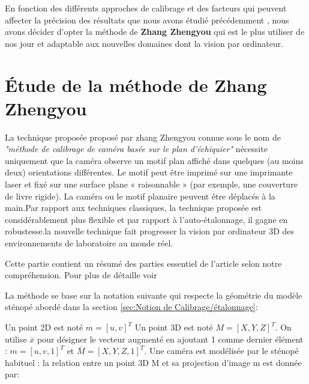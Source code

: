 \begin{itemize}[label={\Huge$\star$}]
\end{itemize}

 
 En fonction des différents approches de calibrage et des facteurs qui peuvent affecter la précision des résultats que nous avons étudié précédemment , nous avons décider d'opter la méthode de \textbf{Zhang Zhengyou}\cite{zhengyou_zhang_flexible_1999} qui est le plus utiliser de nos jour et adaptable aux nouvelles domaines dont la vision par ordinateur.
 
 \section{Étude de la méthode de Zhang Zhengyou}
 
  
 La technique proposée proposé par zhang Zhengyou  \cite{zhengyou_zhang_flexible_1999} connue sous le nom de \textit{"méthode de calibrage de caméra basée sur le plan d'échiquier"} nécessite uniquement que la caméra observe un motif plan affiché dans quelques (au moins deux) orientations  différentes. Le motif peut être imprimé sur une imprimante laser et fixé  sur une surface plane « raisonnable » (par exemple, une couverture de livre rigide). La caméra ou le motif planaire peuvent être déplacés à la main.Par rapport aux techniques classiques, la technique proposée est considérablement plus flexible et par rapport à  l’auto-étalonnage, il gagne en robustesse.la nouvelle technique fait progresser la vision par ordinateur 3D des environnements de laboratoire au monde réel.
 
 Cette partie contient un résumé des parties essentiel de l'article selon notre compréhension. Pour plus de détaille voir
 \cite{zhengyou_zhang_flexible_1999}  
 
 La méthode se base sur la notation suivante qui respecte la géométrie du modèle sténopé abordé dans la section \ref{sec:Notion de  Calibrage/étalonnage}:
 
 Un point 2D est noté $m = [u, v]^{T}$ Un point 3D est noté $M = [X, Y, Z]^{T}$. On utilise $\bar{x}$ pour désigner le vecteur augmenté en ajoutant 1 comme dernier élément : $m =[u, v, 1]^{T}$ et $\bar{M} = [X, Y, Z, 1]^{T}$. Une caméra est modélisée par le sténopé habituel : la relation entre un point 3D M et sa projection d'image m est donnée par:
 
